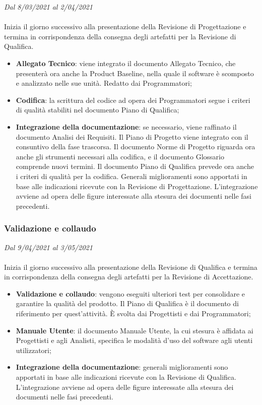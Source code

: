 \textit{Dal 8/03/2021 al 2/04/2021}
\\\\
Inizia il giorno successivo alla presentazione della Revisione di Progettazione e termina in corrispondenza della consegna degli artefatti per la Revisione di Qualifica.
\begin{itemize}
	\item \textbf{Allegato Tecnico}: viene integrato il documento Allegato Tecnico, che presenterà ora anche la Product Baseline, nella quale il software è scomposto e analizzato nelle sue unità. Redatto dai Programmatori;
	\item \textbf{Codifica}: la scrittura del codice ad opera dei Programmatori segue i criteri di qualità stabiliti nel documento Piano di Qualifica;
	\item \textbf{Integrazione della documentazione}: se necessario, viene raffinato il documento Analisi dei Requisiti. Il Piano di Progetto viene integrato con il consuntivo della fase trascorsa.  Il documento Norme di Progetto riguarda ora anche gli strumenti necessari alla codifica, e il documento Glossario comprende nuovi termini. Il documento Piano di Qualifica prevede ora anche i criteri di qualità per la codifica. Generali miglioramenti sono apportati in base alle indicazioni ricevute con la Revisione di Progettazione. L'integrazione avviene ad opera delle figure interessate alla stesura dei documenti nelle fasi precedenti.
\end{itemize}



\subsubsection{Validazione e collaudo}

\textit{Dal 9/04/2021 al 3/05/2021}
\\\\
Inizia il giorno successivo alla presentazione della Revisione di Qualifica e termina in corrispondenza della consegna degli artefatti per la Revisione di Accettazione.
\begin{itemize}
	\item \textbf{Validazione e collaudo}: vengono eseguiti ulteriori test per consolidare e garantire la qualità del prodotto. Il Piano di Qualifica è il documento di riferimento per quest'attività. \`E svolta dai Progettisti e dai Programmatori;
	\item \textbf{Manuale Utente}: il documento Manuale Utente, la cui stesura è affidata ai Progettisti e agli Analisti, specifica le modalità d'uso del software agli utenti utilizzatori;
	\item \textbf{Integrazione della documentazione}: generali miglioramenti sono apportati in base alle indicazioni ricevute con la Revisione di Qualifica. L'integrazione avviene ad opera delle figure interessate alla stesura dei documenti nelle fasi precedenti.
\end{itemize}

